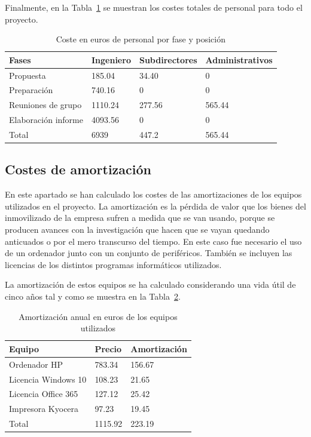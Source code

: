 Finalmente, en la Tabla~\ref{tab:coste-horas} se muestran los costes totales de personal para todo el proyecto.

\begin{table}[H]
    \centering
    \begin{tabular}{llll}
        \toprule
        Fases               & Ingeniero & Subdirectores & Administrativos \\
        \midrule
        Propuesta           & 185.04    & 34.40         & 0               \\
        Preparación         & 740.16    & 0             & 0               \\
        Reuniones de grupo  & 1110.24   & 277.56        & 565.44          \\
        Elaboración informe & 4093.56   & 0             & 0               \\
        \midrule
        Total               & 6939      & 447.2         & 565.44          \\
        \bottomrule
    \end{tabular}
    \caption{Coste en euros de personal por fase y posición}
    \label{tab:coste-horas}
\end{table}

\subsection{Costes de amortización}

En este apartado se han calculado los costes de las amortizaciones de los equipos utilizados en el proyecto.
La amortización es la pérdida de valor que los bienes del inmovilizado de la empresa sufren a medida que se van usando, porque se producen avances con la investigación que hacen que se vayan quedando anticuados o por el mero transcurso del tiempo.
En este caso fue necesario el uso de un ordenador junto con un conjunto de periféricos.
También se incluyen las licencias de los distintos programas informáticos utilizados.

La amortización de estos equipos se ha calculado considerando una vida útil de cinco años tal y como se muestra en la Tabla~\ref{tab:coste-equipos}.

\begin{table}[H]
    \centering
    \begin{tabular}{lll}
        \toprule
        Equipo              & Precio  & Amortización \\
        \midrule
        Ordenador HP        & 783.34  & 156.67       \\
        Licencia Windows 10 & 108.23  & 21.65        \\
        Licencia Office 365 & 127.12  & 25.42        \\
        Impresora Kyocera   & 97.23   & 19.45        \\
        \midrule
        Total               & 1115.92 & 223.19       \\
        \bottomrule
    \end{tabular}
    \caption{Amortización anual en euros de los equipos utilizados}
    \label{tab:coste-equipos}
\end{table}

